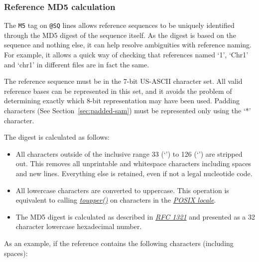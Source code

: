 \subsubsection{Reference MD5 calculation}\label{sec:ref-md5}
The {\tt M5} tag on {\tt @SQ} lines allows reference sequences to be uniquely identified through the MD5 digest of the sequence itself.
As the digest is based on the sequence and nothing else, it can help resolve ambiguities with reference naming.
For example, it allows a quick way of checking that references named `1', `Chr1' and `chr1' in different files are in fact the same.

The reference sequence must be in the 7-bit US-ASCII character set.
All valid reference bases can be represented in this set, and it avoids the problem of determining exactly which 8-bit representation may have been used.
Padding characters (See Section~\ref{sec:padded-sam}) must be represented only using the `*' character. 

The digest is calculated as follows:
\begin{itemize}
\item All characters outside of the inclusive range 33 (`') to 126 (`') are stripped out.
This removes all unprintable and whitespace characters including spaces and new lines.
Everything else is retained, even if not a legal nucleotide code.
\item All lowercase characters are converted to uppercase.
This operation is equivalent to calling \href{http://pubs.opengroup.org/onlinepubs/9699919799/functions/toupper.html}{\sl toupper()} on characters in the \href{http://pubs.opengroup.org/onlinepubs/9699919799/basedefs/V1\_chap07.html\#tag\_07\_02}{\sl POSIX locale}.
\item The MD5 digest is calculated as described in \href{https://tools.ietf.org/html/rfc1321}{\sl RFC 1321} and presented as a 32 character lowercase hexadecimal number.
\end{itemize}

As an example, if the reference contains the following characters (including spaces):
